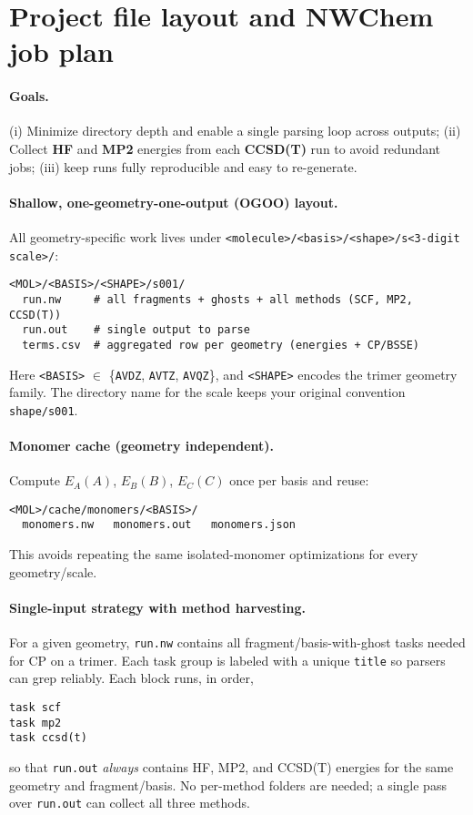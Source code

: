 \section{Project file layout and NWChem job plan}
\label{sec:files}

\paragraph{Goals.}
(i) Minimize directory depth and enable a single parsing loop across outputs;
(ii) Collect \textbf{HF} and \textbf{MP2} energies from each \textbf{CCSD(T)} run to avoid redundant jobs;
(iii) keep runs fully reproducible and easy to re-generate.

\paragraph{Shallow, one-geometry-one-output (OGOO) layout.}
All geometry-specific work lives under
\texttt{\textless molecule\textgreater/\textless basis\textgreater/\textless shape\textgreater/s\textless 3-digit scale\textgreater/}:
\begin{verbatim}
<MOL>/<BASIS>/<SHAPE>/s001/
  run.nw     # all fragments + ghosts + all methods (SCF, MP2, CCSD(T))
  run.out    # single output to parse
  terms.csv  # aggregated row per geometry (energies + CP/BSSE)
\end{verbatim}
Here \texttt{<BASIS>} $\in$ \{\texttt{AVDZ}, \texttt{AVTZ}, \texttt{AVQZ}\}, and \texttt{<SHAPE>} encodes the trimer geometry family.
The directory name for the scale keeps your original convention \texttt{shape/s001}.

\paragraph{Monomer cache (geometry independent).}
Compute $E_A(A)$, $E_B(B)$, $E_C(C)$ once per basis and reuse:
\begin{verbatim}
<MOL>/cache/monomers/<BASIS>/
  monomers.nw   monomers.out   monomers.json
\end{verbatim}
This avoids repeating the same isolated-monomer optimizations for every geometry/scale.

\paragraph{Single-input strategy with method harvesting.}
For a given geometry, \texttt{run.nw} contains all fragment/basis-with-ghost tasks needed for CP on a trimer. Each task group is labeled with a unique \texttt{title} so parsers can grep reliably.
Each block runs, in order,
\begin{verbatim}
task scf
task mp2
task ccsd(t)
\end{verbatim}
so that \texttt{run.out} \emph{always} contains HF, MP2, and CCSD(T) energies for the same geometry and fragment/basis.
No per-method folders are needed; a single pass over \texttt{run.out} can collect all three methods.

